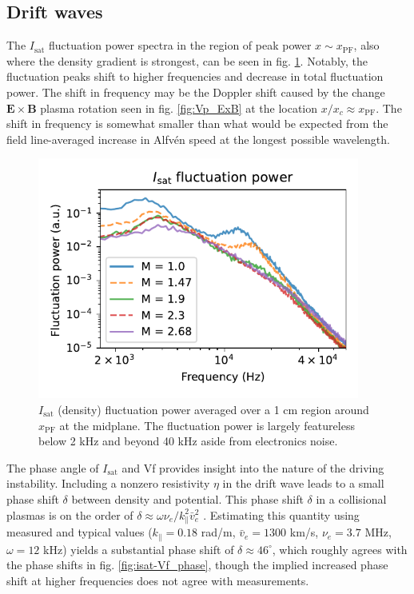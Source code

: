 \subsection{Drift waves}
The $I_\text{sat}$ fluctuation power spectra in the region of peak power $x \sim x_\text{PF}$, also where the density gradient is strongest, can be seen in fig. \ref{fig:isat_fluct_power}. Notably, the fluctuation peaks shift to higher frequencies and decrease in total fluctuation power. The shift in frequency may be the Doppler shift caused by the change $\boldsymbol{E \times B}$ plasma rotation seen in fig. \ref{fig:Vp_ExB} at the location $x/x_c \approx x_\text{PF}$. The shift in frequency is somewhat smaller than what would be expected from the field line-averaged increase in Alfv\'en speed at the longest possible wavelength.
\begin{figure}
    \centering
    \includegraphics[width=300pt]{figures/fig10.pdf}
    \caption[$I_\text{sat}$ (density) fluctuation power]{$I_\text{sat}$ (density) fluctuation power averaged over a 1 cm region around $x_\text{PF}$ at the midplane. The fluctuation power is largely featureless below 2 kHz and beyond 40 kHz aside from electronics noise.}
    \label{fig:isat_fluct_power}
\end{figure}
The phase angle of $I_\text{sat}$ and Vf provides insight into the nature of the driving instability. Including a nonzero resistivity $\eta$ in the drift wave leads to a small phase shift $\delta$ between density and potential.
This phase shift $\delta$ in a collisional plasmas is on the order of $\delta \approx \omega \nu_e / k_\parallel^2 \bar{v}_e^2$ \cite{Horton_1999}. Estimating this quantity using measured and typical values ($k_\parallel = 0.18$ rad/m, $\bar{v}_e = 1300$ km/s, $\nu_e = 3.7$ MHz, $\omega = 12$ kHz) yields a substantial phase shift of $\delta \approx 46^\circ$, which roughly agrees with the phase shifts in fig. \ref{fig:isat-Vf_phase}, though the implied increased phase shift at higher frequencies does not agree with measurements.
